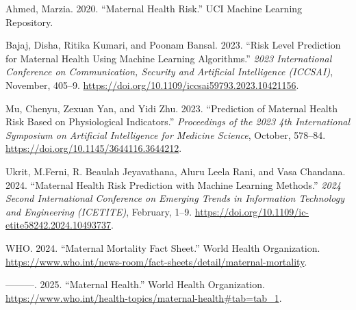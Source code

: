 \documentclass[
  letterpaper,
  DIV=11,
  numbers=noendperiod]{scrartcl}
\newlength{\cslhangindent}
\newenvironment{CSLReferences}[2] %
 {\begin{list}{}{%
  \setlength{\itemindent}{0pt}
  \setlength{\leftmargin}{0pt}
  \setlength{\parsep}{0pt}
  \ifodd #1
   \setlength{\leftmargin}{\cslhangindent}
   \setlength{\itemindent}{-1\cslhangindent}
  \fi
  \setlength{\itemsep}{#2\baselineskip}}}
 {\end{list}}
\begin{document}
\label{refs}
\begin{CSLReferences}{1}{0}
Ahmed, Marzia. 2020. {``{Maternal Health Risk}.''} UCI Machine Learning
Repository.

Bajaj, Disha, Ritika Kumari, and Poonam Bansal. 2023. {``Risk Level
Prediction for Maternal Health Using Machine Learning Algorithms.''}
\emph{2023 International Conference on Communication, Security and
Artificial Intelligence (ICCSAI)}, November, 405--9.
\url{https://doi.org/10.1109/iccsai59793.2023.10421156}.

Mu, Chenyu, Zexuan Yan, and Yidi Zhu. 2023. {``Prediction of Maternal
Health Risk Based on Physiological Indicators.''} \emph{Proceedings of
the 2023 4th International Symposium on Artificial Intelligence for
Medicine Science}, October, 578--84.
\url{https://doi.org/10.1145/3644116.3644212}.

Ukrit, M.Ferni, R. Beaulah Jeyavathana, Aluru Leela Rani, and Vasa
Chandana. 2024. {``Maternal Health Risk Prediction with Machine Learning
Methods.''} \emph{2024 Second International Conference on Emerging
Trends in Information Technology and Engineering (ICETITE)}, February,
1--9. \url{https://doi.org/10.1109/ic-etite58242.2024.10493737}.

WHO. 2024. {``Maternal Mortality Fact Sheet.''} World Health
Organization.
\url{https://www.who.int/news-room/fact-sheets/detail/maternal-mortality}.

---------. 2025. {``Maternal Health.''} World Health Organization.
\url{https://www.who.int/health-topics/maternal-health\#tab=tab_1}.

\end{CSLReferences}
\end{document}

